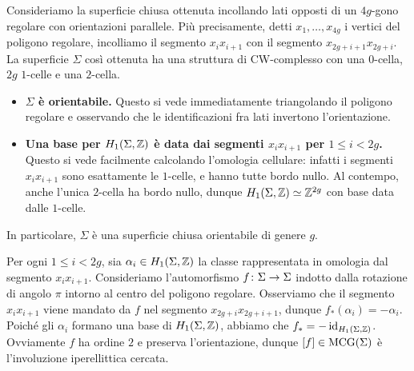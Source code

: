 Consideriamo la superficie chiusa ottenuta incollando lati opposti di un $4g$-gono regolare con orientazioni parallele. Più precisamente, detti $x_1,\ldots,x_{4g}$ i vertici del poligono regolare, incolliamo il segmento $x_ix_{i+1}$ con il segmento $x_{2g+i+1}x_{2g+i}$. La superficie $\Sigma$ così ottenuta ha una struttura di CW-complesso con una $0$-cella, $2g$ $1$-celle e una $2$-cella.
\begin{figure}[h!]
\centering
{}
\end{figure}
\begin{itemize}
\item\textbf{$\Sigma$ è orientabile.} Questo si vede immediatamente triangolando il poligono regolare e osservando che le identificazioni fra lati invertono l'orientazione.
\item\textbf{Una base per $H_1(\Sigma,\mathbb{Z})$ è data dai segmenti $x_ix_{i+1}$ per $1\le i<2g$.} Questo si vede facilmente calcolando l'omologia cellulare: infatti i segmenti $x_ix_{i+1}$ sono esattamente le $1$-celle, e hanno tutte bordo nullo. Al contempo, anche l'unica $2$-cella ha bordo nullo, dunque $H_1(\Sigma,\mathbb{Z})\simeq\mathbb{Z}^{2g}$ con base data dalle $1$-celle.
\end{itemize}
In particolare, $\Sigma$ è una superficie chiusa orientabile di genere $g$.

Per ogni $1\le i<2g$, sia $\alpha_i\in H_1(\Sigma,\mathbb{Z})$ la classe rappresentata in omologia dal segmento $x_ix_{i+1}$. Consideriamo l'automorfismo $\map{f}{\Sigma}{\Sigma}$ indotto dalla rotazione di angolo $\pi$ intorno al centro del poligono regolare. Osserviamo che il segmento $x_ix_{i+1}$ viene mandato da $f$ nel segmento $x_{2g+i}x_{2g+i+1}$, dunque $f_*(\alpha_i)=-\alpha_i$. Poiché gli $\alpha_i$ formano una base di $H_1(\Sigma,\mathbb{Z})$, abbiamo che $f_*=-\operatorname{id}_{H_1(\Sigma,\mathbb{Z})}$. Ovviamente $f$ ha ordine $2$ e preserva l'orientazione, dunque $[f]\in\operatorname{MCG}(\Sigma)$ è l'involuzione iperellittica cercata.

